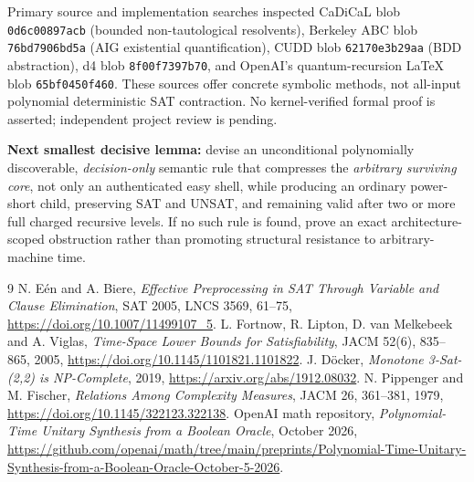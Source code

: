 \documentclass[11pt]{article}
\begin{document}
Primary source and implementation searches inspected CaDiCaL  blob \texttt{0d6c00897acb} (bounded non-tautological resolvents), Berkeley ABC  blob \texttt{76bd7906bd5a} (AIG existential quantification), CUDD  blob \texttt{62170e3b29aa} (BDD abstraction), d4  blob \texttt{8f00f7397b70}, and OpenAI's quantum-recursion LaTeX  blob \texttt{65bf0450f460}. These sources offer concrete symbolic methods, not all-input polynomial deterministic SAT contraction. No kernel-verified formal proof is asserted; independent project review is pending.

\textbf{Next smallest decisive lemma:} devise an unconditional polynomially discoverable, \emph{decision-only} semantic rule that compresses the \emph{arbitrary surviving core}, not only an authenticated easy shell, while producing an ordinary power-short child, preserving SAT and UNSAT, and remaining valid after two or more full charged recursive levels. If no such rule is found, prove an exact architecture-scoped obstruction rather than promoting structural resistance to arbitrary-machine time.

\begin{thebibliography}{9}
 N. E\'en and A. Biere, \emph{Effective Preprocessing in SAT Through Variable and Clause Elimination}, SAT 2005, LNCS 3569, 61--75, \url{https://doi.org/10.1007/11499107_5}.
 L. Fortnow, R. Lipton, D. van Melkebeek and A. Viglas, \emph{Time-Space Lower Bounds for Satisfiability}, JACM 52(6), 835--865, 2005, \url{https://doi.org/10.1145/1101821.1101822}.
 J. D\"ocker, \emph{Monotone 3-Sat-(2,2) is NP-Complete}, 2019, \url{https://arxiv.org/abs/1912.08032}.
 N. Pippenger and M. Fischer, \emph{Relations Among Complexity Measures}, JACM 26, 361--381, 1979, \url{https://doi.org/10.1145/322123.322138}.
 OpenAI math repository, \emph{Polynomial-Time Unitary Synthesis from a Boolean Oracle}, October 2026, \url{https://github.com/openai/math/tree/main/preprints/Polynomial-Time-Unitary-Synthesis-from-a-Boolean-Oracle-October-5-2026}.
\end{thebibliography}
\end{document}
